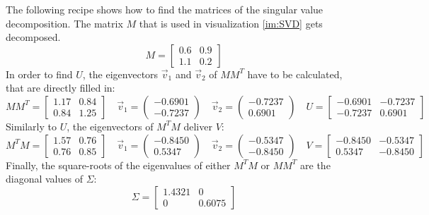 The following recipe\cite{SVD_MIT} shows how to find the matrices of the singular value decomposition. The matrix $M$ that is used in visualization \ref{im:SVD} gets decomposed.
\begin{equation*}
    M= 
    \begin{bmatrix}
        0.6 & 0.9  \\
        1.1 & 0.2
    \end{bmatrix}  
\end{equation*}
In order to find $U$, the eigenvectors $\vec{v}_{1}$ and $\vec{v}_{2}$ of $MM^{T}$ have to be calculated, that are directly filled in:
\begin{equation*}
    MM^{T}= 
    \begin{bmatrix}
        1.17 & 0.84  \\
        0.84 & 1.25
    \end{bmatrix}  \quad
    \vec{v}_{1} =
    \begin{pmatrix}
        -0.6901 \\
        -0.7237
    \end{pmatrix}\quad
    \vec{v}_{2} =
    \begin{pmatrix}
        -0.7237 \\
        0.6901
    \end{pmatrix}\quad
    U= 
    \begin{bmatrix}
        -0.6901 & -0.7237  \\
        -0.7237 & 0.6901
    \end{bmatrix}
\end{equation*}
Similarly to $U$, the eigenvectors of $M^{T}M$ deliver $V$:
\begin{equation*}
    M^{T}M= 
    \begin{bmatrix}
        1.57 & 0.76  \\
        0.76 & 0.85
    \end{bmatrix}  \quad
    \vec{v}_{1} =
    \begin{pmatrix}
        -0.8450 \\
        0.5347
    \end{pmatrix}\quad
    \vec{v}_{2} =
    \begin{pmatrix}
        -0.5347 \\
        -0.8450
    \end{pmatrix}\quad
    V= 
    \begin{bmatrix}
        -0.8450 & -0.5347  \\
        0.5347 & -0.8450
    \end{bmatrix}
\end{equation*}
Finally, the square-roots of the eigenvalues of either $M^{T}M$ or $MM^{T}$ are the diagonal values of $\Sigma$:
\begin{equation*}
    \Sigma= 
    \begin{bmatrix}
        1.4321 & 0  \\
        0 & 0.6075
    \end{bmatrix}
\end{equation*}
